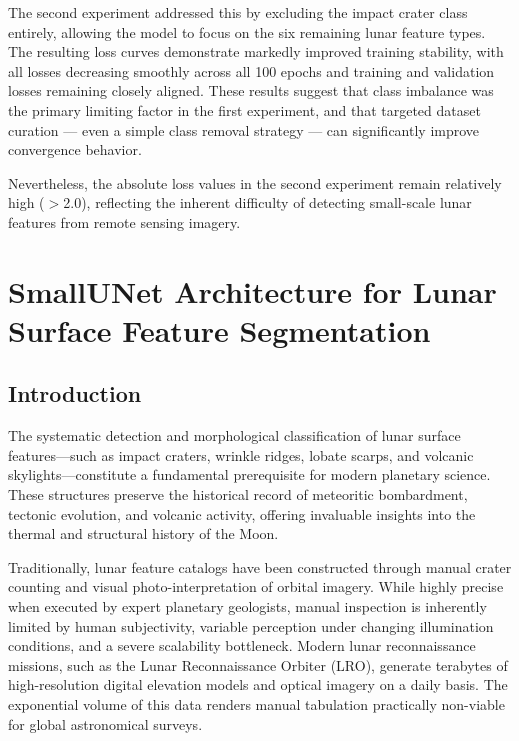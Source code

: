 \documentclass{aa}
\begin{document}
The second experiment addressed this by excluding the impact crater class entirely, 
allowing the model to focus on the six remaining lunar feature types. The resulting 
loss curves demonstrate markedly improved training stability, with all losses 
decreasing smoothly across all 100 epochs and training and validation losses 
remaining closely aligned. These results suggest that class imbalance was the 
primary limiting factor in the first experiment, and that targeted dataset 
curation — even a simple class removal strategy — can significantly improve 
convergence behavior.

Nevertheless, the absolute loss values in the second experiment remain relatively 
high ($>$2.0), reflecting the inherent difficulty of detecting small-scale lunar 
features from remote sensing imagery. 

\FloatBarrier

\section{SmallUNet Architecture for Lunar Surface Feature Segmentation}
\label{sec:smallunet}

\subsection{Introduction}
The systematic detection and morphological classification of lunar surface features---such as impact craters, wrinkle ridges, lobate scarps, and volcanic skylights---constitute a fundamental prerequisite for modern planetary science. These structures preserve the historical record of meteoritic bombardment, tectonic evolution, and volcanic activity, offering invaluable insights into the thermal and structural history of the Moon.

Traditionally, lunar feature catalogs have been constructed through manual crater counting and visual photo-interpretation of orbital imagery. While highly precise when executed by expert planetary geologists, manual inspection is inherently limited by human subjectivity, variable perception under changing illumination conditions, and a severe scalability bottleneck. Modern lunar reconnaissance missions, such as the Lunar Reconnaissance Orbiter (LRO), generate terabytes of high-resolution digital elevation models and optical imagery on a daily basis. The exponential volume of this data renders manual tabulation practically non-viable for global astronomical surveys.
\end{document}
